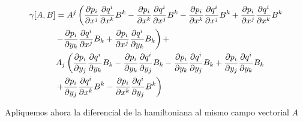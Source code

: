 \documentclass[a4paper,10pt]{article}
\numberwithin{equation}{section}
\newcommand{\zerodel}{.\kern-\nulldelimiterspace}
\begin{document}
\begin{align}
 \gamma[A,B] &= A^j\left(\frac{\partial p_i}{\partial x^j}\frac{\partial q^i}{\partial x^k}B^k
 - \frac{\partial p_i}{\partial x^k}\frac{\partial q^i}{\partial x^j}B^k
 - \frac{\partial p_i}{\partial x^k}\frac{\partial q^i}{\partial x^j}B^k
 + \frac{\partial p_i}{\partial x^j}\frac{\partial q^i}{\partial x^k}B^k\right\zerodel \\
 &\left\zerodel-\frac{\partial p_i}{\partial y_k}\frac{\partial q^i}{\partial x^j}B_k
 +\frac{\partial p_i}{\partial x^j}\frac{\partial q^i}{\partial y_k}B_k\right) + \\
 &A_j\left( \frac{\partial p_i}{\partial y_j}\frac{\partial q^i}{\partial y_k}B_k - 
  \frac{\partial p_i}{\partial y_k}\frac{\partial q^i}{\partial y_j}B_k
  - \frac{\partial p_i}{\partial y_k}\frac{\partial q^i}{\partial y_j}B_k 
  +\frac{\partial p_i}{\partial y_j}\frac{\partial q^i}{\partial y_k}B_k \right\zerodel \\
  &\left\zerodel + \frac{\partial p_i}{\partial y_j}\frac{\partial q^i}{\partial x^k}B^k
  - \frac{\partial p_i}{\partial x^k}\frac{\partial q^i}{\partial y_j}B^k\right)
  \label{eq:Hamilton1}
\end{align}

Apliquemos ahora la diferencial de la hamiltoniana al mismo campo vectorial $A$

% 
% 
\end{document}
